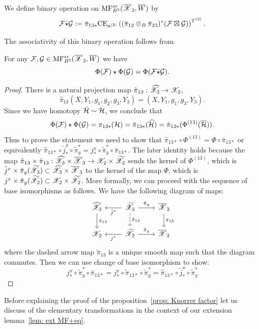 We define binary operation on $\mathrm{MF}^{sc}_{B^2}(\overline{\mathscr{X}}_2,\overline{W})$ by
$$\mathcal{F}\bar{\star}\mathcal{G}:=\bar{\pi}_{13 *}\mathrm{CE}_{\mathfrak{n}^{(2)}}\left((\bar{\pi}_{12}\otimes_B\bar{\pi}_{23})^*(\mathcal{F}\boxtimes\mathcal{G})\right)^{T^{(2)}}.$$

The associativity of this binary operation follows from
\begin{corollary} For any $\mathcal{F},\mathcal{G}\in\mathrm{MF}^{sc}_{B^2}(\overline{\mathscr{X}}_2,\overline{W})$ we have
$$\Phi(\mathcal{F})\star\Phi(\mathcal{G})=\Phi(\mathcal{F}\bar{\star}\mathcal{G}).$$
\end{corollary}
\begin{proof}
There is a natural projection map $\hat{\pi}_{13}: \widehat{\mathscr{X}}_3\to \mathscr{X}_2$, $$\hat{\pi}_{13}(X,Y_1,g_1,g_2,g_3,Y_3)=(X,Y_1,g_1,g_3,Y_3).$$
Since we have homotopy $\hat{\mathcal{H}}\sim \mathcal{H}$, we conclude that
$$\Phi(\mathcal{F})\star\Phi(\mathcal{G})=\pi_{13*}(\mathcal{H})=\hat{\pi}_{13*}(\widehat{\mathcal{H}})=\hat{\pi}_{13*}(\Phi^{(13)}(\overline{\mathcal{H}})).$$
Thus to prove the statement we need to show that $\hat{\pi}_{13*}\circ \Phi^{(13)}=\Phi\circ\bar{\pi}_{13*}$ or equivalently
$\hat{\pi}_{13*}\circ \tilde{j}^x_*\circ \tilde{\pi}^*_y=j_*^x\circ\tilde{\pi}^*_y\circ\bar{\pi}_{13*}.$
The later identity holds because the map $\hat{\pi}_{13}\times\bar{\pi}_{13}: \widehat{\mathscr{X}}_3\times\overline{\mathscr{X}}_3\to \mathscr{X}_2\times \widetilde{\mathscr{X}}_2$ sends
the kernel of $\Phi^{(13)}$, which is $\tilde{j}^x\times \tilde{\pi}_y(\widetilde{\mathscr{X}}_3)\subset  \widehat{\mathscr{X}}_3\times\overline{\mathscr{X}}_3$ to
the kernel of the map $\Phi$, which is $j^x\times \tilde{\pi}_y(\widetilde{\mathscr{X}}_2)\subset  \mathscr{X}_2\times\widetilde{\mathscr{X}}_2$. More formally, we can proceed with the sequence of base isomorphisms as follows. We have the following diagram of maps:
\[
\begin{tikzcd}
\widehat{\calX_3}\arrow[d,"\hat{\pi}_{13}"]&\widetilde{\calX}_3\arrow[r,"\tilde{\pi}_y"]\arrow[d,dashed,"\tilde{\pi}_{13}"]\arrow[l,"\tilde{j}^x"]
&\overline{\calX}_3\arrow[d,"\bar{\pi}_{13}"]\\
\calX_2&\widetilde{\calX}_2\arrow[r,"\tilde{\pi}_y"]\arrow[l,"j^x"]&\overline{\calX}_2
\end{tikzcd}
\]
where the dashed arrow map $\tilde{\pi}_{13}$ is a unique smooth map such that the diagram commutes.
Then we can use change of base isomorphism to show:
\[
j_*^x\circ\tilde{\pi}_y^*\circ \bar{\pi}_{13*}=j_*^x\circ \tilde{\pi}_{13*}\circ\tilde{\pi}^*_y=\hat{\pi}_{13*}\circ\tilde{j}^x_*\circ\tilde{\pi}_y^*
\]


\end{proof}

Before explaining the proof of the proposition~\ref{prop: Knorrer factor} let us discuss of the elementary transformations in the context of our extension lemma~\ref{lem: ext MF+eq}.


